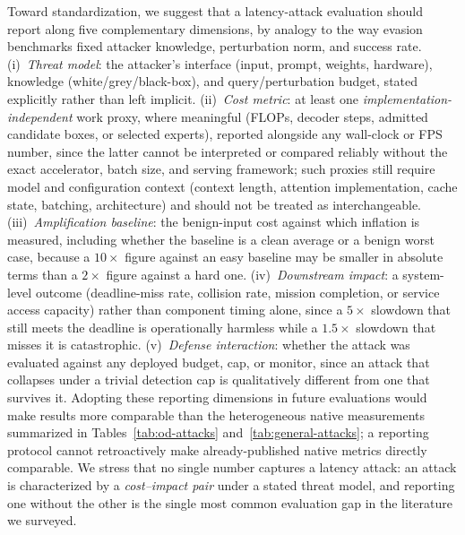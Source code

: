 \documentclass[acmsmall,screen,review,nonacm]{acmart}
\begin{document}
Toward standardization, we suggest that a latency-attack evaluation should report along five complementary dimensions, by analogy to the way evasion benchmarks fixed attacker knowledge, perturbation norm, and success rate. (i)~\emph{Threat model}: the attacker's interface (input, prompt, weights, hardware), knowledge (white/grey/black-box), and query/perturbation budget, stated explicitly rather than left implicit. (ii)~\emph{Cost metric}: at least one \emph{implementation-independent} work proxy, where meaningful (FLOPs, decoder steps, admitted candidate boxes, or selected experts), reported alongside any wall-clock or FPS number, since the latter cannot be interpreted or compared reliably without the exact accelerator, batch size, and serving framework; such proxies still require model and configuration context (context length, attention implementation, cache state, batching, architecture) and should not be treated as interchangeable. (iii)~\emph{Amplification baseline}: the benign-input cost against which inflation is measured, including whether the baseline is a clean average or a benign worst case, because a $10\times$ figure against an easy baseline may be smaller in absolute terms than a $2\times$ figure against a hard one. (iv)~\emph{Downstream impact}: a system-level outcome (deadline-miss rate, collision rate, mission completion, or service access capacity) rather than component timing alone, since a $5\times$ slowdown that still meets the deadline is operationally harmless while a $1.5\times$ slowdown that misses it is catastrophic. (v)~\emph{Defense interaction}: whether the attack was evaluated against any deployed budget, cap, or monitor, since an attack that collapses under a trivial detection cap is qualitatively different from one that survives it. Adopting these reporting dimensions in future evaluations would make results more comparable than the heterogeneous native measurements summarized in Tables~\ref{tab:od-attacks} and~\ref{tab:general-attacks}; a reporting protocol cannot retroactively make already-published native metrics directly comparable. We stress that no single number captures a latency attack: an attack is characterized by a \emph{cost--impact pair} under a stated threat model, and reporting one without the other is the single most common evaluation gap in the literature we surveyed.

\end{document}
